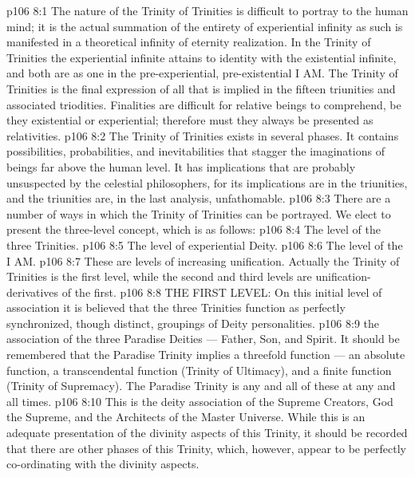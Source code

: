 \vs p106 8:1 The nature of the Trinity of Trinities is difficult to portray to the human mind; it is the actual summation of the entirety of experiential infinity as such is manifested in a theoretical infinity of eternity realization. In the Trinity of Trinities the experiential infinite attains to identity with the existential infinite, and both are as one in the pre\hyp{}experiential, pre\hyp{}existential I AM. The Trinity of Trinities is the final expression of all that is implied in the fifteen triunities and associated triodities. Finalities are difficult for relative beings to comprehend, be they existential or experiential; therefore must they always be presented as relativities.
\vs p106 8:2 The Trinity of Trinities exists in several phases. It contains possibilities, probabilities, and inevitabilities that stagger the imaginations of beings far above the human level. It has implications that are probably unsuspected by the celestial philosophers, for its implications are in the triunities, and the triunities are, in the last analysis, unfathomable.
\vs p106 8:3 There are a number of ways in which the Trinity of Trinities can be portrayed. We elect to present the three\hyp{}level concept, which is as follows:
\vs p106 8:4 \bibnobreakspace The level of the three Trinities.
\vs p106 8:5 \bibnobreakspace The level of experiential Deity.
\vs p106 8:6 \bibnobreakspace The level of the I AM.
\vs p106 8:7 \pc These are levels of increasing unification. Actually the Trinity of Trinities is the first level, while the second and third levels are unification\hyp{}derivatives of the first.
\vs p106 8:8 \pc THE FIRST LEVEL: On this initial level of association it is believed that the three Trinities function as perfectly synchronized, though distinct, groupings of Deity personalities.
\vs p106 8:9 \bibnobreakspace {} the association of the three Paradise Deities --- Father, Son, and Spirit. It should be remembered that the Paradise Trinity implies a threefold function --- an absolute function, a transcendental function (Trinity of Ultimacy), and a finite function (Trinity of Supremacy). The Paradise Trinity is any and all of these at any and all times.
\vs p106 8:10 \pc {}\bibnobreakspace {} This is the deity association of the Supreme Creators, God the Supreme, and the Architects of the Master Universe. While this is an adequate presentation of the divinity aspects of this Trinity, it should be recorded that there are other phases of this Trinity, which, however, appear to be perfectly co\hyp{}ordinating with the divinity aspects.
